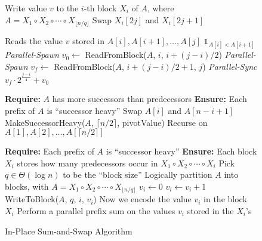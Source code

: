 \documentclass[a4paper,UKenglish,cleveref, autoref, thm-restate]{lipics-v2019}
\begin{document}
\begin{figure*}
  \scriptsize
  \caption{In-Place Sum-and-Swap Algorithm}
	\label{alg:parallelPartition_prefixsumbased_main}
  \begin{algorithmic} %
     \Comment Write value $v$ to the $i$-th block $X_i$ of $A$, where $A = X_1 \circ X_2 \circ \cdots \circ X_{\lfloor n/q \rfloor}$
          \State Swap $X_i[2j]$ and $X_i[2j+1]$
        \EndIf
      \EndFor
    \EndProcedure
    \State

     \Comment Reads the value $v$ stored in $A[i], A[i+1], \ldots, A[j]$
        \State \Return $\mathds{1}_{A[i] < A[i+1]}$
      \Else
        \State \emph{Parallel-Spawn} $v_0 \gets $ ReadFromBlock($A$, $i$, $i+(j-i)/2$)
        \State \emph{Parallel-Spawn} $v_f \gets $ ReadFromBlock($A$, $i+(j-i)/2+1$, $j$)
        \State \emph{Parallel-Sync}
        \State \Return $v_f\cdot 2^\frac{j-i}{4} + v_0$
      \EndIf
    \EndProcedure
    \State

    \State \textbf{Require: } $A$ has more successors than predecessors
    \State \textbf{Ensure: }  Each prefix of $A$ is ``successor heavy''
          \State Swap $A[i]$ and $A[n-i+1]$
        \EndIf
      \EndFor
      \State MakeSuccessorHeavy($A$, $\lceil n/2 \rceil$, pivotValue)
      \Comment Recurse on $A[1],A[2], \ldots, A[\lceil n/2 \rceil]$
    \EndProcedure
    \State


    \State \textbf{Require: } Each prefix of $A$ is ``successor heavy''
    \State \textbf{Ensure: }  Each block $X_i$ stores how many predecessors occur in $X_1 \circ X_2 \circ \cdots \circ X_i$
      \State Pick $q \in \Theta(\log n)$ to be the ``block size''
      \State Logically partition $A$ into blocks, with $A = X_1 \circ X_2 \circ \cdots \circ X_{\lfloor n/q \rfloor}$
        \State $v_i \gets 0$  
            \State $v_i \gets v_i + 1$
          \EndIf
        \EndFor
        \State WriteToBlock($A$, $q$, $i$, $v_i$)
        \Comment Now we encode the value $v_i$ in the block $X_i$
      \EndFor
      \State Perform a parallel prefix sum on the values $v_i$ stored in the $X_i$'s
   \EndProcedure
    \State


\end{algorithmic}
\end{figure*}
\end{document}
